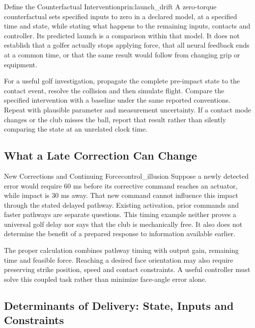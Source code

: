 \begin{principle}{Define the Counterfactual Intervention}{prin:launch_drift}
A zero-torque counterfactual sets specified inputs to zero in a declared
model, at a specified time and state, while stating what happens to the
remaining inputs, contacts and controller. Its predicted launch is a
comparison within that model. It does not establish that a golfer actually
stops applying force, that all neural feedback ends at a common time, or
that the same result would follow from changing grip or equipment.
\end{principle}

For a useful golf investigation, propagate the complete pre-impact state to
the contact event, resolve the collision and then simulate flight. Compare
the specified intervention with a baseline under the same reported conventions.
Repeat with plausible parameter and measurement uncertainty. If a contact
mode changes or the club misses the ball, report that result rather than
silently comparing the state at an unrelated clock time.

\subsection{What a Late Correction Can Change}

\begin{example}{New Corrections and Continuing Force}{control_illusion}
Suppose a newly detected error would require 60 ms before its corrective
command reaches an actuator, while impact is 30 ms away. That new command
cannot influence this impact through the stated delayed pathway. Existing
activation, prior commands and faster pathways are separate questions. This
timing example neither proves a universal golf delay nor says that the club
is mechanically free. It also does not determine the benefit of a prepared
response to information available earlier.
\end{example}

The proper calculation combines pathway timing with output gain, remaining
time and feasible force. Reaching a desired face orientation may also require
preserving strike position, speed and contact constraints. A useful controller
must solve this coupled task rather than minimize face-angle error alone.

\subsection{Determinants of Delivery: State, Inputs and Constraints}

